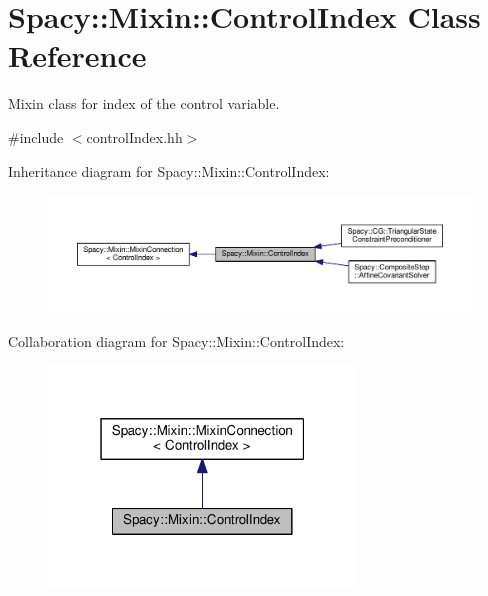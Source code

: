 \hypertarget{classSpacy_1_1Mixin_1_1ControlIndex}{}\section{Spacy\+:\+:Mixin\+:\+:Control\+Index Class Reference}
\label{classSpacy_1_1Mixin_1_1ControlIndex}


Mixin class for index of the control variable.  




{\ttfamily \#include $<$control\+Index.\+hh$>$}



Inheritance diagram for Spacy\+:\+:Mixin\+:\+:Control\+Index\+:\nopagebreak
\begin{figure}[H]
\begin{center}
\leavevmode
\includegraphics[width=350pt]{classSpacy_1_1Mixin_1_1ControlIndex__inherit__graph}
\end{center}
\end{figure}


Collaboration diagram for Spacy\+:\+:Mixin\+:\+:Control\+Index\+:\nopagebreak
\begin{figure}[H]
\begin{center}
\leavevmode
\includegraphics[width=232pt]{classSpacy_1_1Mixin_1_1ControlIndex__coll__graph}
\end{center}
\end{figure}
